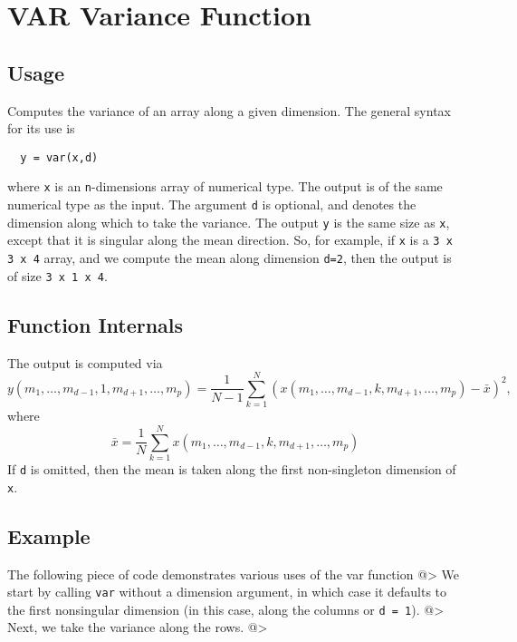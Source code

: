 \section{VAR Variance Function}

\subsection{Usage}

Computes the variance of an array along a given dimension.  The general
syntax for its use is
\begin{verbatim}
  y = var(x,d)
\end{verbatim}
where \verb|x| is an \verb|n|-dimensions array of numerical type.
The output is of the same numerical type as the input.  The argument
\verb|d| is optional, and denotes the dimension along which to take
the variance.  The output \verb|y| is the same size as \verb|x|, except
that it is singular along the mean direction.  So, for example,
if \verb|x| is a \verb|3 x 3 x 4| array, and we compute the mean along
dimension \verb|d=2|, then the output is of size \verb|3 x 1 x 4|.
\subsection{Function Internals}

The output is computed via
\[
y(m_1,\ldots,m_{d-1},1,m_{d+1},\ldots,m_{p}) = \frac{1}{N-1}
\sum_{k=1}^{N} \left(x(m_1,\ldots,m_{d-1},k,m_{d+1},\ldots,m_{p}) 
 - \bar{x}\right)^2,
\]
where 
\[
\bar{x}  = \frac{1}{N}
\sum_{k=1}^{N} x(m_1,\ldots,m_{d-1},k,m_{d+1},\ldots,m_{p})
\]
If \verb|d| is omitted, then the mean is taken along the 
first non-singleton dimension of \verb|x|. 
\subsection{Example}

The following piece of code demonstrates various uses of the var
function
@>
We start by calling \verb|var| without a dimension argument, in which 
case it defaults to the first nonsingular dimension (in this case, 
along the columns or \verb|d = 1|).
@>
Next, we take the variance along the rows.
@>
